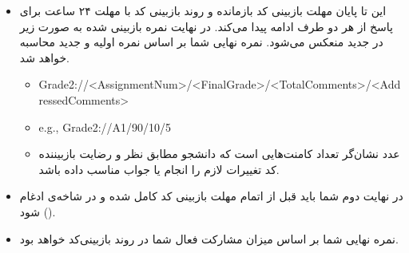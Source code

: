 \begin{itemize}
	\item
	      این
	      تا پایان مهلت بازبینی کد بازمانده و روند بازبینی کد با مهلت ۲۴ ساعت برای پاسخ از هر دو طرف ادامه پیدا می‌کند. در نهایت نمره باز‌بینی شده به صورت زیر در
	      جدید منعکس می‌شود. نمره نهایی شما بر اساس نمره
	      اولیه و
	      جدید محاسبه خواهد شد.
	      \begin{latin}
		      \begin{itemize}
			      \item
			            Grade2://<AssignmentNum>/<FinalGrade>/<TotalComments>/<AddressedComments>
			      \item
			            e.g., Grade2://A1/90/10/5
			      \item
			            \begin{persian}
				            عدد
				            نشان‌گر تعداد کامنت‌هایی است که دانشجو مطابق نظر و رضایت بازبیننده کد تغییرات لازم را انجام یا جواب مناسب داده باشد.
			            \end{persian}
		      \end{itemize}
	      \end{latin}
	\item
	      در نهایت
	      دوم شما باید قبل از اتمام مهلت بازبینی کد کامل شده و در
	      شاخه‌ی
	      ادغام
	      ()
	      شود.
	\item
	      نمره نهایی شما بر اساس میزان مشارکت فعال شما در روند بازبینی‌کد خواهد بود.
\end{itemize}
